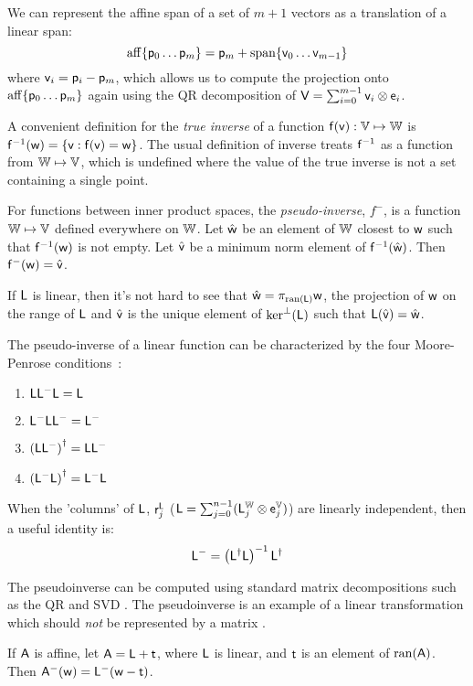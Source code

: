 We can represent the affine span of a set of $m+1$ vectors
as a translation of a linear span:
\begin{equation}
\mathrm{aff}\{ \mathsf{p}_0 \ldots \mathsf{p}_{m} \} = \mathsf{p}_m + \mathrm{span}\{\mathsf{v}_0 \ldots \mathsf{v}_{m-1}\}
\end{equation}
where $\mathsf{v}_i = \mathsf{p}_i - \mathsf{p}_m$,
which allows us to compute the projection onto
$\mathrm{aff}\{ \mathsf{p}_0 \ldots \mathsf{p}_{m} \}$
again using the QR decomposition
of $\mathsf{V} = \sum_{i=0}^{m-1} \mathsf{v}_i \otimes \mathsf{e}_i$.

\label{sec:Linear-inverses-and-pseudo-inverses}

A convenient definition for the \textit{true inverse}
of a function $\mathsf{f}(\mathsf{v}):\mathbb{V} \mapsto \mathbb{W}$ is
$\mathsf{f}^{-1}(\mathsf{w}) = \{ \mathsf{v} : \mathsf{f}(\mathsf{v}) = \mathsf{w} \}$.
The usual definition of inverse treats $\mathsf{f}^{-1}$
as a function from $\mathbb{W} \mapsto \mathbb{V}$,
which is undefined where the value of the true
inverse is not a set containing a single point.

For functions between inner product spaces,
the \textit{pseudo-inverse}, $f^{-}$, is a function $\mathbb{W} \mapsto \mathbb{V}$
defined everywhere on $\mathbb{W}$.
Let $\hat{\mathsf{w}}$ be an element of $\mathbb{W}$ closest to $\mathsf{w}$
such that $\mathsf{f}^{-1}(\mathsf{w})$ is not empty.
Let $\hat{\mathsf{v}}$ be a minimum norm element of $\mathsf{f}^{-1}(\hat{\mathsf{w}})$.
Then $\mathsf{f}^{-}(\mathsf{w}) = \hat{\mathsf{v}}$.

If $\mathsf{L}$ is linear, then it's not hard to see that
$\hat{\mathsf{w}} = \pi_{\mathrm{ran}(\mathsf{L})} \mathsf{w}$, the projection of $\mathsf{w}$
on the range of $\mathsf{L}$
and
$\hat{\mathsf{v}}$ is the unique element of $\mathrm{ker}^{\perp}(\mathsf{L})$
such that $\mathsf{L}(\hat{\mathsf{v}}) = \hat{\mathsf{w}}$.

The pseudo-inverse of a linear function can be characterized
by the four Moore-Penrose 
conditions~\cite[sec.~5.5.2]{golub-vanloan-2012}:
\begin{enumerate}
\item $\mathsf{L} \mathsf{L}^{-} \mathsf{L} = \mathsf{L}$
\item $\mathsf{L}^{-} \mathsf{L} \mathsf{L}^{-} = \mathsf{L}^{-}$
\item $\left( \mathsf{L} \mathsf{L}^{-} \right)^{\dagger} = \mathsf{L} \mathsf{L}^{-}$
\item $\left( \mathsf{L}^{-} \mathsf{L} \right)^{\dagger} = \mathsf{L}^{-} \mathsf{L}$
\end{enumerate}

When the 'columns' of $\mathsf{L}$, $\mathsf{r}_j^{\mathsf{L}}$
($\mathsf{L} = \sum_{j=0}^{n-1} ( \mathsf{L}_j^{\mathbb{W}} \otimes \mathsf{e}_j^{\mathbb{V}} )$)
are linearly independent,
then a useful identity is:
\begin{equation}
\label{eq:full-rank-pseudo-inverse}
\mathsf{L}^{-} = \left( \mathsf{L}^{\dagger} \mathsf{L} \right)^{-1} \mathsf{L}^{\dagger}
\end{equation}

The pseudoinverse can be computed
using standard matrix decompositions such as
the QR and SVD \cite{golub-vanloan-2012}.
The pseudoinverse is an example of a linear transformation
which should {\em not} be represented by a matrix
\cite{mcdonald-1989b}.

If $\mathsf{A}$ is affine,
let $\mathsf{A} = \mathsf{L} + \mathsf{t}$,
where $\mathsf{L}$ is linear,
and $\mathsf{t}$ is an element of $\mathrm{ran}(\mathsf{A})$.
Then $\mathsf{A}^{-}(\mathsf{w}) = \mathsf{L}^{-}( \mathsf{w} - \mathsf{t} )$.

